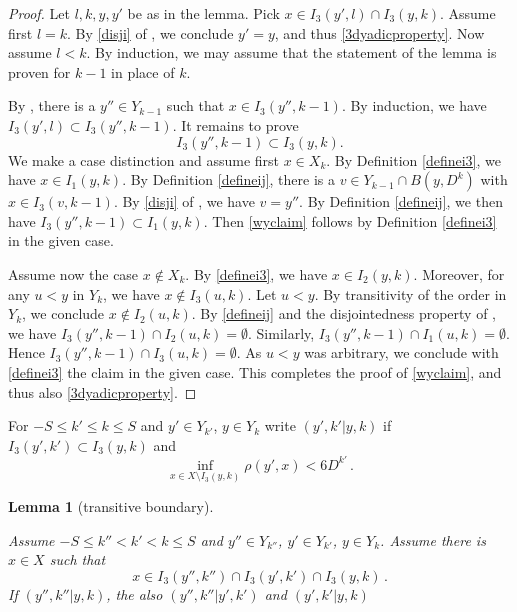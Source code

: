 \documentclass[10pt,a4paper]{article}
\theoremstyle{plain}
\newtheorem{lemma}[theorem]{Lemma}
\theoremstyle{definition}
\numberwithin{equation}{subsection}
\newcommand{\lean}[1]{}
\newcommand{\uses}[1]{}
\newcommand{\leanok}{}
\begin{document}
\begin{proof}
\leanok
Let $l,k,y,y'$ be as in the lemma. Pick $x\in I_3(y',l)\cap I_3(y,k)$. Assume first $l=k$. By \eqref{disji} of , we conclude $y'=y$, and thus \eqref{3dyadicproperty}. Now assume $l<k$. By induction, we may assume that the statement of the lemma is proven for $k-1$ in place of $k$.

By , there is a $y''\in Y_{k-1}$ such that $x\in I_3(y'',k-1)$. By induction, we have $I_3(y',l)\subset I_3(y'',k-1)$. It remains to prove
\begin{equation}\label{wyclaim}
I_3(y'',k-1)\subset I_3(y,k).
\end{equation}
We make a case distinction and assume first $x\in X_k$. By Definition \eqref{definei3}, we have $x\in I_1(y,k)$. By Definition \eqref{defineij}, there is a $v\in Y_{k-1}\cap B(y,D^k)$ with $x\in I_3(v,k-1)$. By \eqref{disji} of , we have $v=y''$. By Definition \eqref{defineij}, we then have $I_3(y'',k-1)\subset I_1(y,k)$. Then \eqref{wyclaim} follows by Definition \eqref{definei3} in the given case.

Assume now the case $x\notin X_k$. By \eqref{definei3}, we have $x\in I_2(y,k)$. Moreover, for any $u<y$ in $Y_k$, we have $x\not\in I_3(u,k)$. Let $u<y$. By transitivity of the order in $Y_k$, we conclude $x\not \in I_2(u,k)$. By \eqref{defineij} and the disjointedness property of , we have $I_3(y'',k-1)\cap I_2(u,k)= \emptyset$. Similarly, $I_3(y'',k-1)\cap I_1(u,k)= \emptyset$. Hence $I_3(y'',k-1)\cap I_3(u,k)=\emptyset$. As $u<y$ was arbitrary, we conclude with \eqref{definei3} the claim in the given case. This completes the proof of \eqref{wyclaim}, and thus also \eqref{3dyadicproperty}.
\end{proof}

For $-S\le k'\le k\le S$ and $y'\in Y_{k'}$, $y\in Y_k$
write $(y',k'|y,k)$ if $I_3(y',k')\subset I_3(y,k)$ and
\begin{equation}\label{bdcond}
    \inf_{x\in X\setminus I_3(y,k)}\rho(y',x)<6D^{k'}\, .
\end{equation}

\begin{lemma}[transitive boundary]
    \label{transitive-boundary}
    \uses{dyadic-property}
    \leanok
    \lean{transitive_boundary}
    Assume $-S\le k''< k'< k\le S$ and
    $y''\in Y_{k''}$, $y'\in Y_{k'}$, $y\in Y_k$.
    Assume there is $x\in X$ such that
    \begin{equation}
    x\in I_3(y'',k'')\cap I_3(y',k')\cap I_3(y,k)\, .
    \end{equation}
    If $(y'',k''|y,k)$, the also
    $(y'',k''|y',k')$ and $(y',k'|y,k)$
\end{lemma}
\end{document}
